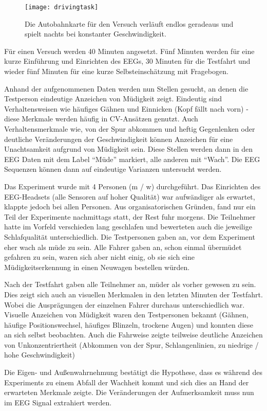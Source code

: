 \begin{figure}[h] 
  \begin{center}
    \texttt{[image: drivingtask]}
    \caption[Driving Task Screenshot]{Die Autobahnkarte für den Versuch verläuft endlos geradeaus und spielt nachts bei konstanter Geschwindigkeit. \label{fig:drivingtask}}
  \end{center}
\end{figure}

Für einen Versuch werden 40 Minuten angesetzt. Fünf Minuten werden für eine kurze Einführung und Einrichten des EEGs, 30 Minuten für die Testfahrt und wieder fünf Minuten für eine kurze Selbsteinschätzung mit Fragebogen.

Anhand der aufgenommenen Daten werden nun Stellen gesucht, an denen die Testperson eindeutige Anzeichen von Müdigkeit zeigt. Eindeutig sind Verhaltensweisen wie häufiges Gähnen und Einnicken (Kopf fällt nach vorn) - diese Merkmale werden häufig in CV-Ansätzen genutzt. 
Auch Verhaltensmerkmale wie, von der Spur abkommen und heftig Gegenlenken oder deutliche Veränderungen der Geschwindigkeit können Anzeichen für eine Unachtsamkeit aufgrund von Müdigkeit sein. Diese Stellen werden dann in den EEG Daten mit dem Label "`Müde"' markiert, alle anderen mit "`Wach"'. Die EEG Sequenzen können dann auf eindeutige Varianzen untersucht werden. 

Das Experiment wurde mit 4 Personen (m / w) durchgeführt. Das Einrichten des EEG-Headsets (alle Sensoren auf hoher Qualität) war aufwändiger als erwartet, klappte jedoch bei allen Personen. Aus organisatorischen Gründen, fand nur ein Teil der Experimente nachmittags statt, der Rest fuhr morgens. Die Teilnehmer hatte im Vorfeld verschieden lang geschlafen und bewerteten auch die jeweilige Schlafqualität unterschiedlich. Die Testpersonen gaben an, vor dem Experiment eher wach als müde zu sein. Alle Fahrer gaben an, schon einmal übermüdet gefahren zu sein, waren sich aber nicht einig, ob sie sich eine Müdigkeitserkennung in einen Neuwagen bestellen würden.

Nach der Testfahrt gaben alle Teilnehmer an, müder als vorher gewesen zu sein. Dies zeigt sich auch an visuellen Merkmalen in den letzten Minuten der Testfahrt. Wobei die Ausprägungen der einzelnen Fahrer durchaus unterschiedlich war. Visuelle Anzeichen von Müdigkeit waren den Testpersonen bekannt (Gähnen, häufige Positionswechsel, häufiges Blinzeln, trockene Augen) und konnten diese an sich selbst beobachten. Auch die Fahrweise zeigte teilweise deutliche Anzeichen von Unkonzentriertheit (Abkommen von der Spur, Schlangenlinien, zu niedrige / hohe Geschwindigkeit)\drivingTask


Die Eigen- und Außenwahrnehmung bestätigt die Hypothese, dass es während des Experiments zu einem Abfall der Wachheit kommt und sich dies an Hand der erwarteten Merkmale zeigte. Die Veränderungen der Aufmerksamkeit muss nun im EEG Signal extrahiert werden.